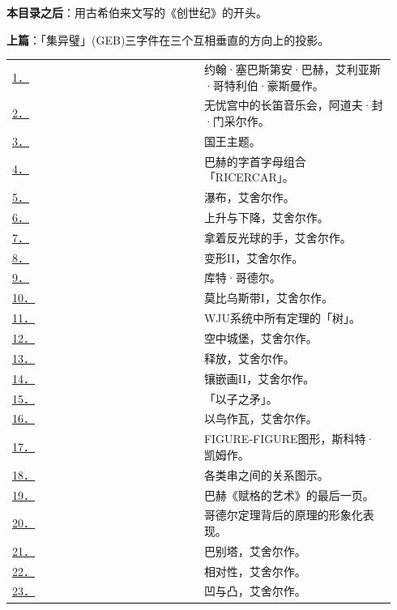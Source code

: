 \documentclass[
  12pt,
  twoside,
  openright,
  oldfontcommands,
]{memoir}
\begin{document}
\textbf{本目录之后}：用古希伯来文写的《创世纪》的开头。

\hfill\break

\textbf{上篇}：「集异璧」(GEB)三字件在三个互相垂直的方向上的投影。

\begin{longtable}[]{>{\raggedright\arraybackslash}p{0.47\linewidth} >{\raggedright\arraybackslash}p{0.47\linewidth}}
\toprule\noalign{}
\endhead
\bottomrule\noalign{}
\endlastfoot
\hyperref[fig:1]{1．} & 约翰·塞巴斯第安·巴赫，艾利亚斯·哥特利伯·豪斯曼作。 \\
\hyperref[fig:2]{2．} & 无忧宫中的长笛音乐会，阿道夫·封·门采尔作。 \\
\hyperref[fig:3]{3．} & 国王主题。 \\
\hyperref[fig:4]{4．} & 巴赫的字首字母组合「RICERCAR」。 \\
\hyperref[fig:5]{5．} & 瀑布，艾舍尔作。 \\
\hyperref[fig:6]{6．} & 上升与下降，艾舍尔作。 \\
\hyperref[fig:7]{7．} & 拿着反光球的手，艾舍尔作。 \\
\hyperref[fig:8]{8．} & 变形II，艾舍尔作。 \\
\hyperref[fig:9]{9．} & 库特·哥德尔。 \\
\hyperref[fig:10]{10．} & 莫比乌斯带I，艾舍尔作。 \\
\hyperref[fig:11]{11．} & WJU系统中所有定理的「树」。 \\
\hyperref[fig:12]{12．} & 空中城堡，艾舍尔作。 \\
\hyperref[fig:13]{13．} & 释放，艾舍尔作。 \\
\hyperref[fig:14]{14．} & 镶嵌画II，艾舍尔作。 \\
\hyperref[fig:15]{15．} & 「以子之矛」。 \\
\hyperref[fig:16]{16．} & 以鸟作瓦，艾舍尔作。 \\
\hyperref[fig:17]{17．} & FIGURE-FIGURE图形，斯科特·凯姆作。 \\
\hyperref[fig:18]{18．} & 各类串之间的关系图示。 \\
\hyperref[fig:19]{19．} & 巴赫《赋格的艺术》的最后一页。 \\
\hyperref[fig:20]{20．} & 哥德尔定理背后的原理的形象化表现。 \\
\hyperref[fig:21]{21．} & 巴别塔，艾舍尔作。 \\
\hyperref[fig:22]{22．} & 相对性，艾舍尔作。 \\
\hyperref[fig:23]{23．} & 凹与凸，艾舍尔作。 \\

\end{longtable}
\end{document}
